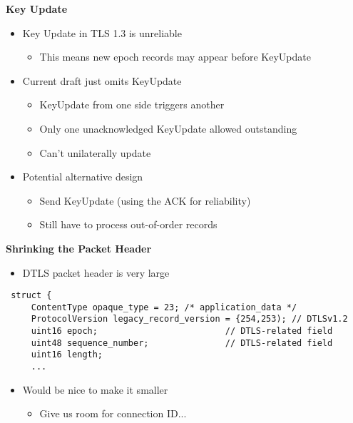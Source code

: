 \documentclass[helvetica]{seminar}
\newcommand{\heading}[1]{%
  \begin{center} 
    \large\bf 
    #1 
  \end{center} 
  \vspace{.4 in}}
\begin{document}
\begin{slide}
\heading{Key Update}

\begin{itemize}
\item Key Update in TLS 1.3 is unreliable
  \begin{itemize}
  \item This means new epoch records may appear before KeyUpdate
  \end{itemize}
\item Current draft just omits KeyUpdate
  \begin{itemize}
  \item KeyUpdate from one side triggers another
  \item Only one unacknowledged KeyUpdate allowed outstanding
  \item Can't unilaterally update
  \end{itemize}

\item Potential alternative design
  \begin{itemize}
  \item Send KeyUpdate (using the ACK for reliability)
  \item Still have to process out-of-order records
  \end{itemize}
\end{itemize}
\end{slide}

\begin{slide}
\heading{Shrinking the Packet Header}

\begin{itemize}
\item DTLS packet header is very large
\end{itemize}

{\small
\begin{verbatim}
 struct {
     ContentType opaque_type = 23; /* application_data */
     ProtocolVersion legacy_record_version = {254,253); // DTLSv1.2
     uint16 epoch;                         // DTLS-related field
     uint48 sequence_number;               // DTLS-related field
     uint16 length;
     ...
\end{verbatim}
}

\begin{itemize}
\item Would be nice to make it smaller
  \begin{itemize}
  \item Give us room for connection ID...
  \end{itemize}
\end{itemize}

\end{slide}
\end{document}
